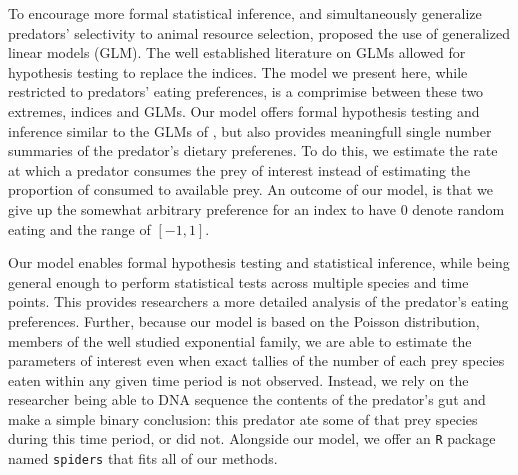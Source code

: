 To encourage more formal statistical inference, and simultaneously generalize predators' selectivity to animal resource selection, \citet{Manly:1992} proposed the use of generalized linear models (GLM).  The well established literature on GLMs allowed for hypothesis testing to replace the indices.  The model we present here, while restricted to predators' eating preferences, is a comprimise between these two extremes, indices and GLMs.  Our model offers formal hypothesis testing and inference similar to the GLMs of \citet{Manly:1992}, but also provides meaningfull single number summaries of the predator's dietary preferenes.  To do this, we estimate the rate at which a predator consumes the prey of interest instead of estimating the proportion of consumed to available prey.  An outcome of our model, is that we give up the somewhat arbitrary preference for an index to have $0$ denote random eating and the range of $[-1,1]$.  

Our model enables formal hypothesis testing and statistical inference, while being general enough to perform statistical tests across multiple species and time points.  This provides researchers a more detailed analysis of the predator's eating preferences.  Further, because our model is based on the Poisson distribution, members of the well studied exponential family, we are able to estimate the parameters of interest even when exact tallies of the number of each prey species eaten within any given time period is not observed.  Instead, we rely on the researcher being able to DNA sequence the contents of the predator's gut and make a simple binary conclusion: this predator ate some of that prey species during this time period, or did not.  Alongside our model, we offer an \texttt{R} \cite{Core-Team:2014} package named \texttt{spiders} that fits all of our methods.  


